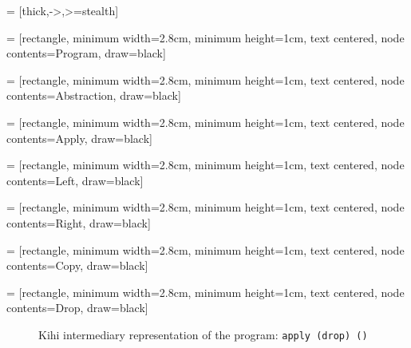  = [thick,->,>=stealth]

 = [rectangle, minimum width=2.8cm, minimum height=1cm, text centered, node contents=Program, draw=black]

 = [rectangle, minimum width=2.8cm, minimum height=1cm, text centered, node contents=Abstraction, draw=black]

 = [rectangle, minimum width=2.8cm, minimum height=1cm, text centered, node contents=Apply, draw=black]

 = [rectangle, minimum width=2.8cm, minimum height=1cm, text centered, node contents=Left, draw=black]

 = [rectangle, minimum width=2.8cm, minimum height=1cm, text centered, node contents=Right, draw=black]

 = [rectangle, minimum width=2.8cm, minimum height=1cm, text centered, node contents=Copy, draw=black]

 = [rectangle, minimum width=2.8cm, minimum height=1cm, text centered, node contents=Drop, draw=black]

\begin{figure}[htb]
    \centering
    \caption{Kihi intermediary representation of the program: \lstinline{apply (drop) ()}}
    \label{fig:kihi_intermediary_representation_example_1}
\end{figure}


